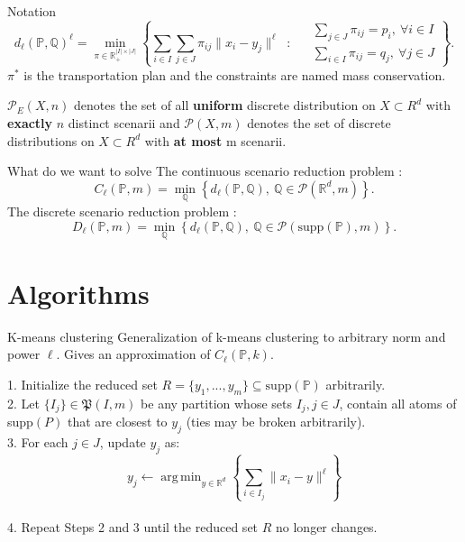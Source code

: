 \documentclass{beamer}
\newcommand{\R}{\mathbb{R}}
\DeclareMathOperator*{\argmin}{arg\,min}
\theoremstyle{plain}
\begin{document}
\begin{frame}{Notation}
\[
d_\ell(\mathbb{P},\mathbb{Q})^\ell=\min_{\pi\in\mathbb{R}_+^{\lvert I\rvert\times\lvert J\rvert}}\left\{ 
\sum_{i\in I}\sum_{j\in J}\pi_{ij}\lVert x_i-y_j\rVert^\ell \: \text{ : } \:  \begin{aligned}
& \sum_{j\in J}\pi_{ij}=p_i, \: \forall i\in I \\
& \sum_{i\in I}\pi_{ij}=q_j, \: \forall j\in J
\end{aligned}\right\}.
\]
    $\pi^*$ is the \alert{transportation plan} and the constraints are named \alert{mass conservation}.
    \newline
    
    $\mathcal{P}_E(X,n)$ denotes the set of all \textbf{uniform} discrete distribution on $X\subset R^d$ with \textbf{exactly} $n$ distinct scenarii and $\mathcal{P}(X,m)$ denotes the set of discrete distributions on $X\subset R^d$ with \textbf{at most} m scenarii. 
\end{frame}

\begin{frame}{What do we want to solve}
    The \alert{continuous} scenario reduction problem : 
$$
C_\ell(\mathbb{P},m)=\min_\mathbb{Q}\left\{d_\ell(\mathbb{P},\mathbb{Q}),\: \mathbb{Q}\in\mathcal{P}(\mathbb{R}^d,m)\right\}. 
$$
The \alert{discrete} scenario reduction problem :
$$
D_\ell(\mathbb{P},m)=\min_\mathbb{Q}\left\{d_\ell(\mathbb{P},\mathbb{Q}),\: \mathbb{Q}\in\mathcal{P}(\text{supp}(\mathbb{P}),m)\right\}.
$$
\end{frame}

\section{Algorithms}
\begin{frame}{K-means clustering}
Generalization of k-means clustering to arbitrary norm and power $\ell$. Gives an approximation of \alert{$C_\ell\left(\mathbb{P},k\right).$}
\begin{algorithm}[H]
    \caption{k-means clustering for $C_\ell\left(\mathbb{P},m\right)$}
    1. Initialize the reduced set $R=\{y_1,...,y_m\} \subseteq \text{supp}\left(\mathbb{P}\right)$ arbitrarily. \\ 2. Let $\{I_j\}\in\mathfrak{P}\left(I,m\right)$ be any partition whose sets $I_j, j\in J$, contain all atoms of supp$\left(P\right)$ that are closest to $y_j$ (ties may be broken arbitrarily). \\ 3. For each $j\in J$, update $y_j$ as: 
    \[
      y_j \gets \argmin_{y\in\R^d} \left\{ \sum_{i\in I_j} \lVert x_i-y \rVert^\ell \right\}
    \] 
    \\ 4. Repeat Steps 2 and 3 until the reduced set $R$ no longer changes.
\end{algorithm}
\end{frame}
\end{document}
